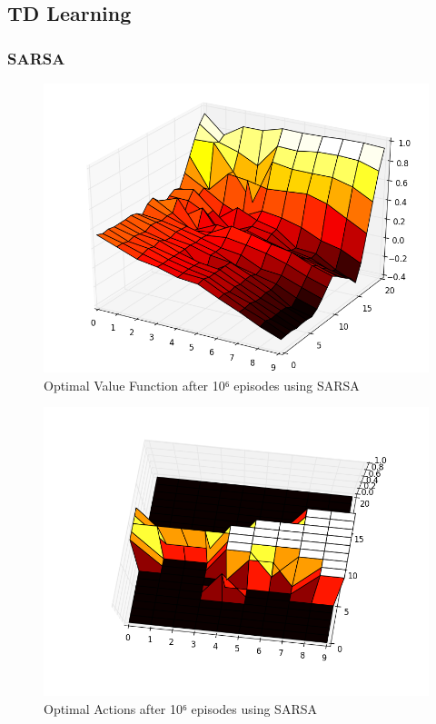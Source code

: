\documentclass[12pt,a4paper]{article}
\begin{document}
\subsection{TD Learning}

\subsubsection{SARSA}

\begin{figure}[!ht]
   \caption{\label{E21_S_V} Optimal Value Function after 10⁶ episodes using SARSA}
   \includegraphics[scale=0.5]{Easy21_Results/Sarsa_value_1e6.png}
\end{figure}

\begin{figure}[!ht]
   \caption{\label{E21_S_D} Optimal Actions after 10⁶ episodes using SARSA}
   \includegraphics[scale=0.5]{Easy21_Results/Sarsa_decision_1e6.png}
\end{figure}
\end{document}
